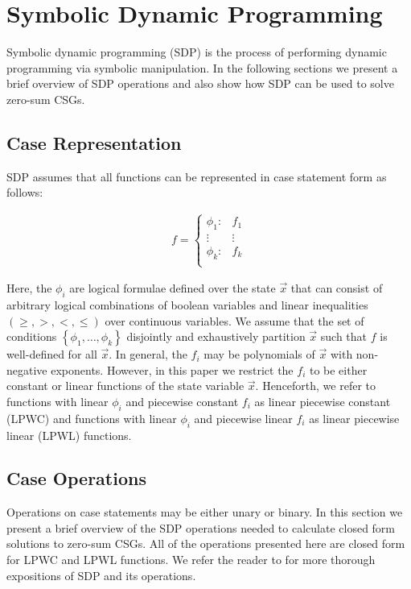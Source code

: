 \section{Symbolic Dynamic Programming}
\label{sec:sdp}

Symbolic dynamic programming (SDP) \cite{Boutilier_IJCAI_2001} is 
the process of performing dynamic programming via symbolic 
manipulation. In the following sections we present a brief overview
of SDP operations and also show how SDP can be used to solve
zero-sum CSGs.

\subsection{Case Representation}

SDP assumes that all functions can be represented in case statement form \cite{Boutilier_IJCAI_2001} as follows:

{\small 
\abovedisplayskip=0pt
\belowdisplayskip=0pt
\begin{align*}
  f = 
    \begin{cases}
      \phi_1: & f_1 \\ 
      \vdots & \vdots\\ 
      \phi_k: & f_k \\ 
    \end{cases}
\end{align*}
}%

Here, the $\phi_i$ are logical formulae defined over the state $\vec{x}$ 
that can consist of arbitrary logical combinations of boolean variables and 
linear inequalities $\left( \geq, >, <, \leq \right)$ over continuous variables. We assume that the set of
conditions $\left\lbrace \phi_1, \ldots, \phi_k \right\rbrace$ disjointly
and exhaustively partition $\vec{x}$ such that $f$ is well-defined for all $\vec{x}$.
In general, the $f_i$ may be polynomials of $\vec{x}$ with non-negative exponents.
However, in this paper we restrict the $f_i$ to be either constant or linear functions 
of the state variable $\vec{x}$. Henceforth, we refer to functions with 
linear $\phi_i$ and piecewise constant $f_i$ as linear piecewise constant (LPWC) 
and functions with linear $\phi_i$ and piecewise linear $f_i$ 
as linear piecewise linear (LPWL) functions.

\subsection{Case Operations}

Operations on case statements may be either unary or binary. In this section
we present a brief overview of the SDP operations needed to calculate closed form
solutions to zero-sum CSGs. All of the operations presented here are closed form
for LPWC and LPWL functions. We refer the reader to \cite{Sanner_UAI_2011,Zamani_AAAI_2012} 
for more thorough expositions of SDP and its operations.


